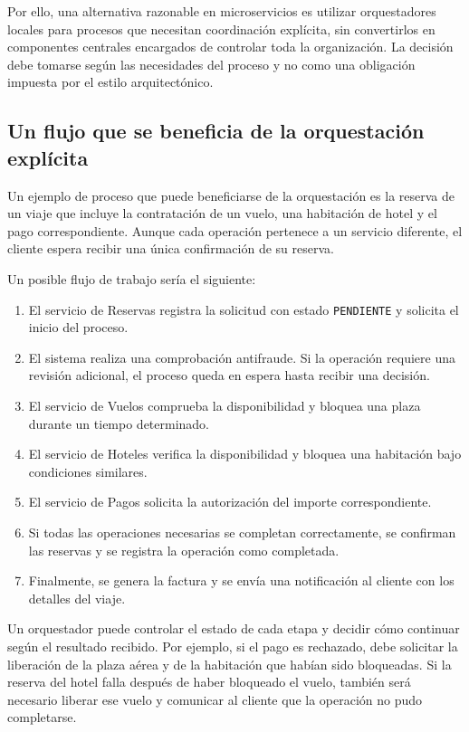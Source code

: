 Por ello, una alternativa razonable en microservicios es utilizar orquestadores locales para procesos que necesitan coordinación explícita, sin convertirlos en componentes centrales encargados de controlar toda la organización. La decisión debe tomarse según las necesidades del proceso y no como una obligación impuesta por el estilo arquitectónico.

\subsection{Un flujo que se beneficia de la orquestación explícita}

Un ejemplo de proceso que puede beneficiarse de la orquestación es la reserva de un viaje que incluye la contratación de un vuelo, una habitación de hotel y el pago correspondiente. Aunque cada operación pertenece a un servicio diferente, el cliente espera recibir una única confirmación de su reserva.

Un posible flujo de trabajo sería el siguiente:

\begin{enumerate}
    \item El servicio de Reservas registra la solicitud con estado \texttt{PENDIENTE} y solicita el inicio del proceso.
    \item El sistema realiza una comprobación antifraude. Si la operación requiere una revisión adicional, el proceso queda en espera hasta recibir una decisión.
    \item El servicio de Vuelos comprueba la disponibilidad y bloquea una plaza durante un tiempo determinado.
    \item El servicio de Hoteles verifica la disponibilidad y bloquea una habitación bajo condiciones similares.
    \item El servicio de Pagos solicita la autorización del importe correspondiente.
    \item Si todas las operaciones necesarias se completan correctamente, se confirman las reservas y se registra la operación como completada.
    \item Finalmente, se genera la factura y se envía una notificación al cliente con los detalles del viaje.
\end{enumerate}

Un orquestador puede controlar el estado de cada etapa y decidir cómo continuar según el resultado recibido. Por ejemplo, si el pago es rechazado, debe solicitar la liberación de la plaza aérea y de la habitación que habían sido bloqueadas. Si la reserva del hotel falla después de haber bloqueado el vuelo, también será necesario liberar ese vuelo y comunicar al cliente que la operación no pudo completarse.

